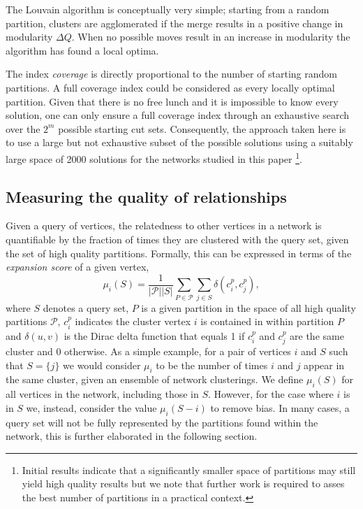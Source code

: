\documentclass[sigconf]{acmart}
\begin{document}
The Louvain algorithm is conceptually very simple; starting from a random partition, clusters are agglomerated if the merge results in a positive change in modularity $\Delta Q$.
When no possible moves result in an increase in modularity the algorithm has found a local optima.

The index \textit{coverage} is directly proportional to the number of starting random partitions.
A full coverage index could be considered as every locally optimal partition.
Given that there is no free lunch and it is impossible to know every solution, one can only ensure a full coverage index through an exhaustive search over the $2^m$ possible starting cut sets.
Consequently, the approach taken here is to use a large but not exhaustive subset of the possible solutions using a suitably large space of 2000 solutions for the networks studied in this paper
\footnote{Initial results indicate that a significantly smaller space of partitions may still yield high quality results but we note that further work is required to asses the best number of partitions in a practical context.}.

\subsection{Measuring the quality of relationships} \label{sec:expansion}
Given a query of vertices, the relatedness to other vertices in a network is quantifiable by the fraction of times they are clustered with the query set, given the set of high quality partitions.
Formally, this can be expressed in terms of the \textit{expansion score} of a given vertex,
\begin{equation} \label{eq:mu_score}
\mu_i(S) = \frac{1}{|\mathcal{P}| |S| } \sum_{P \in \mathcal{P}} \sum_{j \in S} \delta(c^{p}_i, c^{p}_j),
\end{equation}
where $S$ denotes a query set, $P$ is a given partition in the space of all high quality partitions $\mathcal{P}$, $c^{p}_{i}$ indicates the cluster vertex $i$ is contained in within partition $P$ and
$\delta(u, v)$ is the Dirac delta function that equals 1 if $c^{p}_i$ and  $c^{p}_j$ are the same cluster and $0$ otherwise.
As a simple example, for a pair of vertices $i$ and $S$ such that $S = \{j\}$ we would consider $\mu_i$ to be the number of times $i$ and $j$ appear in the same cluster, given an ensemble of network clusterings.
We define $\mu_i(S)$ for all vertices in the network, including those in $S$.
However, for the case where $i$ is in $S$ we, instead, consider the value $\mu_i(S - i)$ to remove bias.
In many cases, a query set will not be fully represented by the partitions found within the network, this is further elaborated in the following section.
\end{document}
